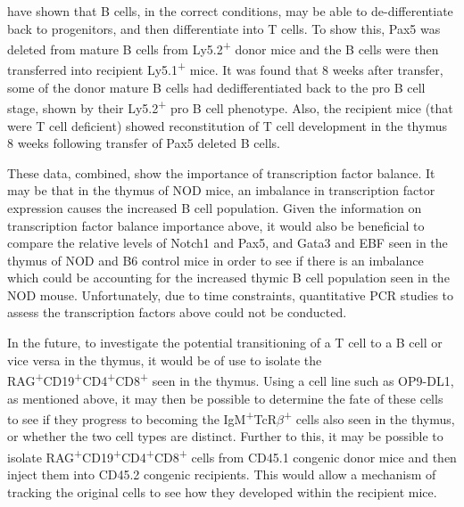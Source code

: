 \citet{Cobaleda2007} have shown that B cells, in the correct conditions, may be able to de-differentiate back to progenitors, and then differentiate into T cells.
To show this, Pax5 was deleted from mature B cells from Ly5.2\textsuperscript{+} donor mice and the B cells were then transferred into recipient Ly5.1\textsuperscript{+} mice.
It was found that 8 weeks after transfer, some of the donor mature B cells had dedifferentiated back to the pro B cell stage, shown by their Ly5.2\textsuperscript{+} pro B cell phenotype.
Also, the recipient mice (that were T cell deficient) showed reconstitution of T cell development in the thymus 8 weeks following transfer of Pax5 deleted B cells.

These data, combined, show the importance of transcription factor balance.
It may be that in the thymus of NOD mice, an imbalance in transcription factor expression causes the increased B cell population.
Given the information on transcription factor balance importance above, it would also be beneficial to compare the relative levels of Notch1 and Pax5, and Gata3 and EBF seen in the thymus of NOD and B6 control mice in order to see if there is an imbalance which could be accounting for the increased thymic B cell population seen in the NOD mouse.
Unfortunately, due to time constraints, quantitative PCR studies to assess the transcription factors above could not be conducted.


In the future, to investigate the potential transitioning of a T cell to a B cell or vice versa in the thymus, it would be of use to isolate the RAG\textsuperscript{+}CD19\textsuperscript{+}CD4\textsuperscript{+}CD8\textsuperscript{+} seen in the thymus.
Using a cell line such as OP9-DL1, as mentioned above, it may then be possible to determine the fate of these cells to see if they progress to becoming the IgM\textsuperscript{+}TcR$\beta$\textsuperscript{+} cells also seen in the thymus, or whether the two cell types are distinct.
Further to this, it may be possible to isolate RAG\textsuperscript{+}CD19\textsuperscript{+}CD4\textsuperscript{+}CD8\textsuperscript{+} cells from CD45.1 congenic donor mice and then inject them into CD45.2 congenic recipients.
This would allow a mechanism of tracking the original cells to see how they developed within the recipient mice.

